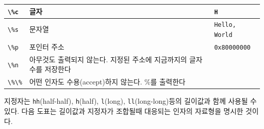 \documentclass[a4paper,12pt]{book}
\newcommand{\V}[1]{\Verb|#1|}
\begin{document}
\begin{longtable}{ || m{6em} || m{17em} | m{6em} || }
        \hline \V{\%c}                       & 글자                                                                 & \V{H} \\
        \hline \V{\%s}                       & 문자열                                                               & \V{Hello, World} \\
        \hline \V{\%p}                       & 포인터 주소                                                          & \V{0x80000000} \\
        \hline \V{\%n}                       & 아무것도 출력되지 않는다. 지정된 주소에 지금까지의 글자수를 저장한다 & \\
        \hline \V{\%\%}                      & 어떤 인자도 수용(accept)하지 않는다. \%를 출력한다                   & \\
        \hline
    \end{longtable}
\endgroup

지정자는 \V{hh}(half-half), \V{h}(half), \V{l}(long), \V{ll}(long-long)등의 길이값과 함께 사용될 수 있다.
다음 도표는 길이값과 지정자가 조합될때 대응되는 인자의 자료형을 명시한 것이다.
\end{document}

